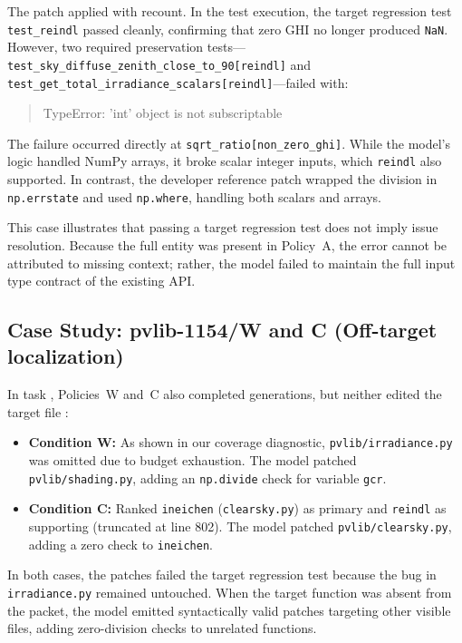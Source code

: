 \documentclass[11pt]{article}
\begin{document}
{\sloppy
The patch applied with recount.  In the test execution, the target
regression test \texttt{test\_reindl} passed cleanly, confirming that zero
GHI no longer produced \texttt{NaN}.  However, two required preservation
tests---\nolinkurl{test_sky_diffuse_zenith_close_to_90[reindl]} and
\nolinkurl{test_get_total_irradiance_scalars[reindl]}---failed with:
\par}
\begin{quote}\small\ttfamily\raggedright
TypeError: 'int' object is not subscriptable
\end{quote}
The failure occurred directly at \texttt{sqrt\_ratio[non\_zero\_ghi]}.
While the model's logic handled NumPy arrays, it broke scalar integer
inputs, which \texttt{reindl} also supported.  In contrast, the developer
reference patch wrapped the division in \texttt{np.errstate} and used
\texttt{np.where}, handling both scalars and arrays.

This case illustrates that passing a target regression test does not imply
issue resolution.  Because the full entity was present in Policy~A, the
error cannot be attributed to missing context; rather, the model failed
to maintain the full input type contract of the existing API.

\subsection{Case Study: pvlib-1154/W and C (Off-target localization)}

In task , Policies~W and~C also completed generations, but
neither edited the target file :
\begin{itemize}[nosep]
  \item \textbf{Condition W:} As shown in our coverage diagnostic,
    \texttt{pvlib/irradiance.py} was omitted due to budget exhaustion.
    The model patched \texttt{pvlib/shading.py}, adding an
    \texttt{np.divide} check for variable \texttt{gcr}.
  \item \textbf{Condition C:} Ranked \texttt{ineichen} (\texttt{clearsky.py})
    as primary and \texttt{reindl} as supporting (truncated at line 802).
    The model patched \texttt{pvlib/clearsky.py}, adding a zero check to
    \texttt{ineichen}.
\end{itemize}
In both cases, the patches failed the target regression test because the
bug in \texttt{irradiance.py} remained untouched.  When the target function
was absent from the packet, the model emitted syntactically valid patches
targeting other visible files, adding zero-division checks to unrelated functions.
\end{document}
